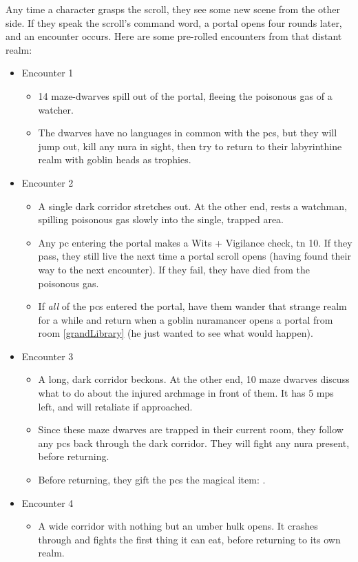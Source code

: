 \begin{multicols}{2}
Any time a character grasps the scroll, they see some new scene from the other side.
If they speak the scroll's command word, a portal opens four rounds later, and an encounter occurs.
Here are some pre-rolled encounters from that distant realm:

\needspace{4em}
\begin{itemize}

  \item{Encounter 1}
  \begin{itemize}
    \item{14 maze-dwarves spill out of the portal, fleeing the poisonous gas of a watcher.}
    \item{The dwarves have no languages in common with the \glspl{pc}, but they will jump out, kill any nura in sight, then try to return to their labyrinthine realm with goblin heads as trophies.}
  \end{itemize}
  \item{Encounter 2}
  \begin{itemize}
    \item{A single dark corridor stretches out.  At the other end, rests a watchman, spilling poisonous gas slowly into the single, trapped area.}
    \item
    Any \gls{pc} entering the portal makes a Wits + Vigilance check, \gls{tn} 10. If they pass, they still live the next time a portal scroll opens (having found their way to the next encounter). If they fail, they have died from the poisonous gas.
    \item
    If \emph{all} of the \glspl{pc} entered the portal, have them wander that strange realm for a while and return when a goblin nuramancer opens a portal from room \ref{grandLibrary}\iftoggle{oneshot}{}{ of the lower warren} (he just wanted to see what would happen).
  \end{itemize}
  \item{Encounter 3}
  \begin{itemize}
    \item{A long, dark corridor beckons. At the other end, 10 maze dwarves discuss what to do about the injured archmage in front of them. It has 5 \glspl{mp} left, and will retaliate if approached.}
    \item{Since these maze dwarves are trapped in their current room, they follow any \glspl{pc} back through the dark corridor.  They will fight any nura present, before returning.}
    \item
    Before returning, they gift the \glspl{pc} the magical item: \lootMagic.
  \end{itemize}
  \item{Encounter 4}
  \begin{itemize}
    \item{A wide corridor with nothing but an umber hulk opens. It crashes through and fights the first thing it can eat, before returning to its own realm.}
  \end{itemize}
\end{itemize}

\end{multicols}

